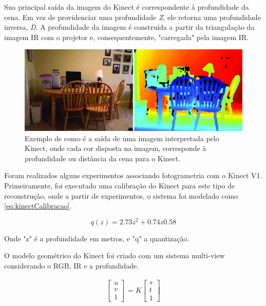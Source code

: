 Sua principal saída da imagem do Kinect é correspondente à profundidade da cena. Em vez de providenciar uma profundidade {\it Z}, ele retorna uma profundidade inversa, {\it D}.
A profundidade da imagem é construída a partir da triangulação da imagem IR com o projetor e, consequentemente, "carregada" pela imagem IR.

\begin{figure}[!h]
	\centering
	\includegraphics[width=1\linewidth]{figs/profundidadekinect.png}
	\caption{%
	Exemplo de como é a saída de uma imagem interpretada pelo Kinect, onde cada cor disposta na imagem, corresponde à profundidade ou distância da cena para o Kinect.
	}\label{fig:profKinect}
\end{figure}
 
Foram realizados alguns experimentos associando fotogrametria com o Kinect V1. Primeiramente, foi executado uma calibração do Kinect para este tipo de reconstrução, onde a partir de experimentos, o sistema foi modelado como \ref{eq:kinectCalibracao}.

\begin{equation}
\label{eq:kinectCalibracao}
q(z)=2.73z^{2}+0.74z 0.58
\end{equation}

Onde "z" é a profundidade em metros, e "q" a quantização.

O modelo geométrico do Kinect foi criado com um sistema multi-view considerando o RGB, IR e a profundidade.

\begin{gather} 
\label{eq:matrix}
\begin{bmatrix}
u\\
v\\
1
\end{bmatrix} 
= K
\begin{bmatrix}
s\\
t\\
1
\end{bmatrix}
\end{gather}

